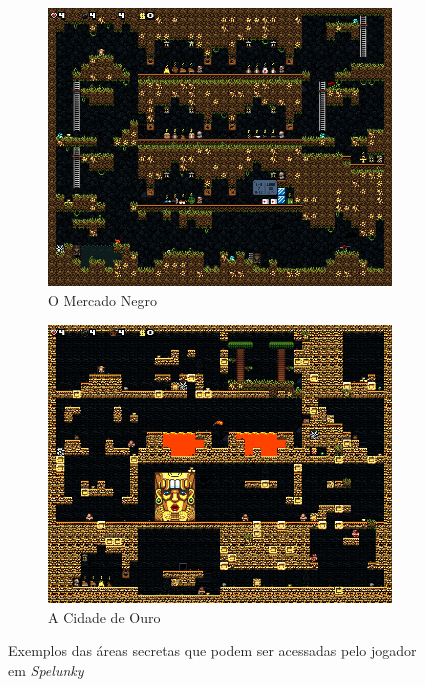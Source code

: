 \begin{figure}[htb!]
\centering
	\begin{subfigure}[b]{0.4\textwidth}
		\includegraphics[width=\textwidth]{fig/spelunky-blackmarket.png}
		\caption{O Mercado Negro}
		\label{fig:spelunky-blackmarket}
	\end{subfigure}
	\begin{subfigure}[b]{0.4\textwidth}
		\includegraphics[width=\textwidth]{fig/spelunky-cityofgold.png}
		\caption{A Cidade de Ouro}
		\label{fig:spelunky-cityofgold}
	\end{subfigure}
	\caption{Exemplos das áreas secretas que podem ser acessadas pelo jogador em
	\textit{Spelunky}}
	\label{fig:spelunky-secret-areas}
\end{figure}


